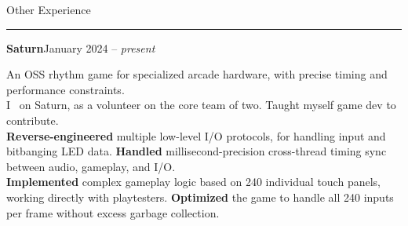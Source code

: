 




  \vspace{10pt}

  {\sectionfont Other Experience\vspace{2pt}\hrule}

  \vspace{5pt}
  \textbf{Saturn}\quad{}\hfill January 2024 -- \emph{present}
  \begin{adjustwidth}{10pt}{}
    An OSS rhythm game for specialized arcade hardware, with precise timing and performance constraints.\\
    I~ on Saturn, as a volunteer on the core team of two. Taught myself game dev to contribute.\\
    \textbf{Reverse-engineered} multiple low-level I/O protocols, for handling input and bitbanging LED data.
    \textbf{Handled} millisecond-precision cross-thread timing sync between audio, gameplay, and I/O.\\
    \textbf{Implemented} complex gameplay logic based on 240 individual touch panels, working directly with playtesters.
    \textbf{Optimized} the game to handle all 240 inputs per frame without excess garbage collection.

  \end{adjustwidth}

